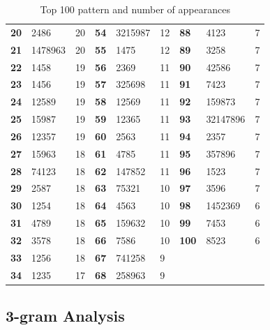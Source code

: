 {{\begin{table}[H]
\begin{tabular}{l | l l | l | l l  | l | l l }
	      {\bf 20} & 2486       & 20  & {\bf 54} & 3215987  & 12 & {\bf 88} & 4123 & 7 \\ 
	      {\bf 21} & 1478963    & 20  & {\bf 55} & 1475     & 12 & {\bf 89} & 3258 & 7 \\ 
	      {\bf 22} & 1458       & 19  & {\bf 56} & 2369     & 11 & {\bf 90} & 42586 & 7 \\ 
	      {\bf 23} & 1456       & 19  & {\bf 57} & 325698   & 11 & {\bf 91} & 7423 & 7 \\ 
	      {\bf 24} & 12589      & 19  & {\bf 58} & 12569    & 11 & {\bf 92} & 159873 & 7 \\ 
	      {\bf 25} & 15987      & 19  & {\bf 59} & 12365    & 11 & {\bf 93} & 32147896 & 7 \\ 
	      {\bf 26} & 12357      & 19  & {\bf 60} & 2563     & 11 & {\bf 94} & 2357 & 7 \\ 
	      {\bf 27} & 15963      & 18  & {\bf 61} & 4785     & 11 & {\bf 95} & 357896 & 7 \\ 
	      {\bf 28} & 74123      & 18  & {\bf 62} & 147852   & 11 & {\bf 96} & 1523 & 7 \\ 
	      {\bf 29} & 2587       & 18  & {\bf 63} & 75321    & 10 & {\bf 97} & 3596 & 7 \\ 
	      {\bf 30} & 1254       & 18  & {\bf 64} & 4563     & 10 & {\bf 98} & 1452369 & 6 \\ 
	      {\bf 31} & 4789       & 18  & {\bf 65} & 159632   & 10 & {\bf 99} & 7453 & 6 \\ 
	      {\bf 32} & 3578       & 18  & {\bf 66} & 7586     & 10 & {\bf 100} & 8523 & 6 \\ 
	      {\bf 33} & 1256       & 18  & {\bf 67} & 741258   & 9  & & & \\ 
	      {\bf 34} & 1235       & 17  & {\bf 68} & 258963   & 9  & & & \\ \hline
	    \end{tabular} 
	    \caption{Top 100 pattern and number of appearances}
	    \label{tab:top100}
	  \end{table}

	\clearpage
	\subsection{3-gram Analysis} \label{sec:3gram}
		
}}
